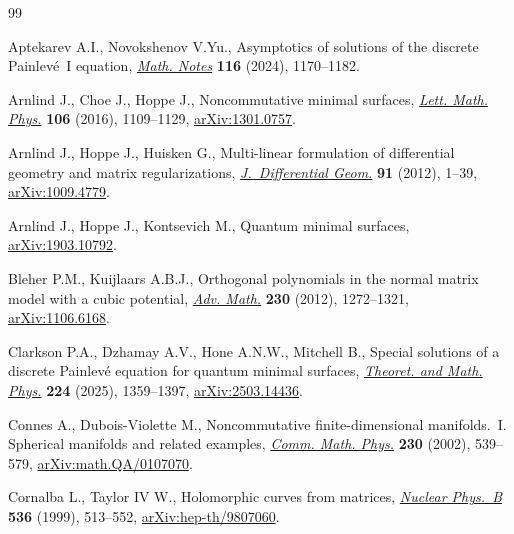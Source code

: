 \begin{thebibliography}{99}
\footnotesize\itemsep=0pt

Aptekarev A.I., Novokshenov V.Yu., Asymptotics of solutions of the discrete
 {P}ainlev\'e~{I} equation,
 \href{https://doi.org/10.4213/mzm14491}{\textit{Math. Notes}} \textbf{116}
 (2024), 1170--1182.

Arnlind J., Choe J., Hoppe J., Noncommutative minimal surfaces,
 \href{https://doi.org/10.1007/s11005-016-0861-7}{\textit{Lett. Math. Phys.}}
 \textbf{106} (2016), 1109--1129,
 \href{http://arxiv.org/abs/1301.0757}{arXiv:1301.0757}.

Arnlind J., Hoppe J., Huisken G., Multi-linear formulation of differential
 geometry and matrix regularizations,
 \href{https://doi.org/10.4310/jdg/1343133699}{\textit{J.~Differential Geom.}}
 \textbf{91} (2012), 1--39,
 \href{http://arxiv.org/abs/1009.4779}{arXiv:1009.4779}.

Arnlind J., Hoppe J., Kontsevich M., Quantum minimal surfaces,
 \href{http://arxiv.org/abs/1903.10792}{arXiv:1903.10792}.

Bleher P.M., Kuijlaars A.B.J., Orthogonal polynomials in the normal matrix
 model with a cubic potential,
 \href{https://doi.org/10.1016/j.aim.2012.03.021}{\textit{Adv. Math.}}
 \textbf{230} (2012), 1272--1321,
 \href{http://arxiv.org/abs/1106.6168}{arXiv:1106.6168}.

Clarkson P.A., Dzhamay A.V., Hone A.N.W., Mitchell B., Special solutions of a
 discrete {P}ainlev\'e equation for quantum minimal surfaces,
 \href{https://doi.org/10.1134/S0040577925080045}{\textit{Theoret. and Math.
 Phys.}} \textbf{224} (2025), 1359--1397,
 \href{http://arxiv.org/abs/2503.14436}{arXiv:2503.14436}.

Connes A., Dubois-Violette M., Noncommutative finite-dimensional
 manifolds.~{I}. {S}pherical manifolds and related examples,
 \href{https://doi.org/10.1007/s00220-002-0715-2}{\textit{Comm. Math. Phys.}}
 \textbf{230} (2002), 539--579,
 \href{http://arxiv.org/abs/math.QA/0107070}{arXiv:math.QA/0107070}.

Cornalba L., Taylor IV W., Holomorphic curves from matrices,
 \href{https://doi.org/10.1016/S0550-3213(98)00702-0}{\textit{Nuclear
 Phys.~B}} \textbf{536} (1999), 513--552,
 \href{http://arxiv.org/abs/hep-th/9807060}{arXiv:hep-th/9807060}.


\end{thebibliography}
